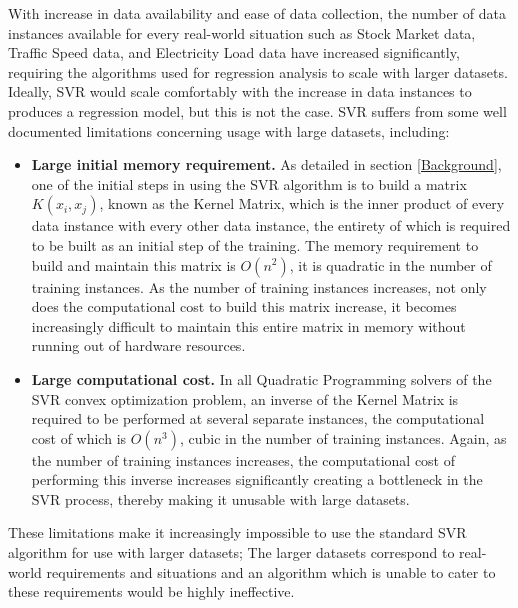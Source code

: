 \documentclass[12pt]{article}
\begin{document}
With increase in data availability and ease of data collection, the number of data instances available for every real-world situation such as Stock Market data, Traffic Speed data, and Electricity Load data have increased significantly, requiring the algorithms used for regression analysis to scale with larger datasets.
\newline\newline
Ideally, SVR would scale comfortably with the increase in data instances to produces a regression model, but this is not the case. SVR suffers from some well documented limitations concerning usage with large datasets, including:
\begin{itemize}
\item {\bf Large initial memory requirement.} As detailed in section \ref{Background}, one of the initial steps in using the SVR algorithm is to build a matrix $K(x_{i}, x_{j})$, known as the Kernel Matrix, which is the inner product of every data instance with every other data instance, the entirety of which is required to be built as an initial step of the training. The memory requirement to build and maintain this matrix is $O(n^2)$, it is quadratic in the number of training instances. As the number of training instances increases, not only does the computational cost to build this matrix increase, it becomes increasingly difficult to maintain this entire matrix in memory without running out of hardware resources.

\item {\bf Large computational cost.} In all Quadratic Programming solvers of the SVR convex optimization problem, an inverse of the Kernel Matrix is required to be performed at several separate instances, the computational cost of which is $O(n^3)$, cubic in the number of training instances. Again, as the number of training instances increases, the computational cost of performing this inverse increases significantly creating a bottleneck in the SVR process, thereby making it unusable with large datasets.
\end{itemize}

These limitations make it increasingly impossible to use the standard SVR algorithm for use with larger datasets; The larger datasets correspond to real-world requirements and situations and an algorithm which is unable to cater to these requirements would be highly ineffective.
\end{document}
